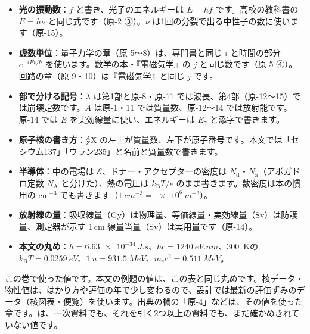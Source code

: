 {\small
\begin{itemize}[leftmargin=1.2\zw, itemsep=2pt, topsep=1pt, label={\color{bkVol}●}]
\item \textbf{光の振動数}：$f$ と書き、光子のエネルギーは $E=hf$ です。高校の教科書の $E=h\nu$ と同じ式です（原-2 ③）。$\nu$ は1回の分裂で出る中性子の数に使います（原-15）。
\item \textbf{虚数単位}：量子力学の章（原-5〜8）は、専門書と同じ $i$ と時間の部分 $e^{-iEt/\hbar}$ を使います。数学の本・『電磁気学』の $j$ と同じ数です（原-5 ④）。回路の章（原-9・10）は『電磁気学』と同じ $j$ です。
\item \textbf{部で分ける記号}：$\lambda$ は第1部と原-8・原-11 では波長、第4部（原-12〜15）では崩壊定数です。$A$ は原-1・11 では質量数、原-12〜14 では放射能です。原-14 では $E$ を実効線量に使い、エネルギーは $E_\gamma$ と添字で書きます。
\item \textbf{原子核の書き方}：${}^{A}_{Z}\mathrm X$ の左上が質量数、左下が原子番号です。本文では「セシウム137」「ウラン235」と名前と質量数で書きます。
\item \textbf{半導体}：中の電場は $\mathcal E$、ドナー・アクセプターの密度は $N_{\mathrm d}$・$N_{\mathrm a}$（アボガドロ定数 $N_{\mathrm A}$ と分けた）、熱の電圧は $k_{\mathrm B}T/e$ のまま書きます。数密度は本の慣用の cm$^{-3}$ でも書きます（$\qty{1}{cm^{-3}}=\qty{e6}{m^{-3}}$）。
\item \textbf{放射線の量}：吸収線量（Gy）は物理量、等価線量・実効線量（Sv）は防護量、測定器が示す 1\,cm 線量当量（Sv）は実用量です（原-14）。
\item \textbf{本文の丸め}：$h=\qty{6.63e-34}{J.s}$、$hc=\qty{1240}{eV.nm}$、\qty{300}{K}の $k_{\mathrm B}T=\qty{0.0259}{eV}$、$\qty{1}{u}=\qty{931.5}{MeV}$、$m_{\mathrm e}c^2=\qty{0.511}{MeV}$。
\end{itemize}\par}

{\small この巻で使った値です。本文の例題の値は、この表と同じ丸めです。核データ・物性値は、はかり方や評価の年で少し変わるので、設計では最新の評価ずみのデータ（核図表・便覧）を使います。出典の欄の「原-4」などは、その値を使った章です。\phyk は、一次資料でも、それを引く2つ以上の資料でも、まだ確かめきれていない値です。\par}


